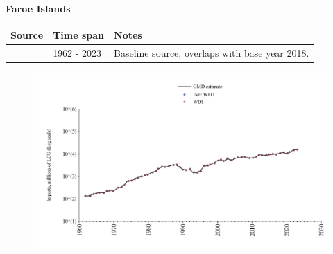 \documentclass[12pt,a4paper,landscape]{article}
\begin{document}
\begin{adjustbox}{max totalsize={\paperwidth}{\paperheight},center}
\begin{minipage}[t][\textheight][t]{\textwidth}
\vspace*{0.5cm}
{}
\begin{center}
{\Large\bfseries Faroe Islands}
\end{center}
\vspace{0.5cm}
\begin{table}[H]
\centering
\small
\begin{tabular}{|l|l|l|}
\hline
\textbf{Source} & \textbf{Time span} & \textbf{Notes} \\
\hline
\rowcolor{white}\cite{WDI}& 1962 - 2023 &Baseline source, overlaps with base year 2018.\\
\hline
\end{tabular}
\end{table}
\begin{figure}[H]
\centering
\includegraphics[width=\textwidth,height=0.6\textheight,keepaspectratio]{graphs/FRO_imports.pdf}
\end{figure}
\end{minipage}
\end{adjustbox}
\end{document}
